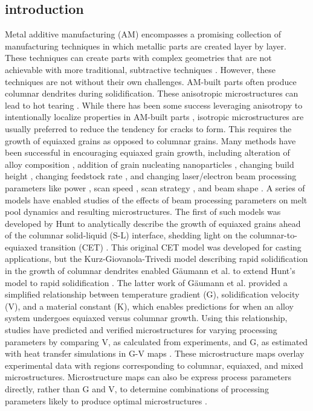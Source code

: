\subsection{introduction}
Metal additive manufacturing (AM) encompasses a promising collection of
manufacturing techniques in which metallic parts are created layer by
layer. These techniques can create parts with complex geometries that are
not achievable with more traditional, subtractive techniques
\cite{Chu2008}. However, these techniques are not without their own
challenges. AM-built parts often produce columnar dendrites during
solidification. These anisotropic microstructures can lead to hot tearing
\cite{Kaufmann2016,Martin2017,Gu2019}.
While there has been some success
leveraging anisotropy to intentionally localize properties in AM-built
parts \cite{Dehoff2015,Plotkowski2021}, isotropic microstructures are
usually preferred to reduce the tendency for cracks to form. This requires
the growth of equiaxed grains as opposed to columnar grains. Many methods
have been successful in encouraging equiaxed grain growth, including
alteration of alloy composition \cite{Spittle2013,Bermingham2019,Zhu2019},
addition of grain nucleating nanoparticles \cite{Martin2017,Gu2019}, changing
build height \cite{Qiu2015}, changing feedstock rate
\cite{Wu2004,Qiu2015}, and changing laser/electron beam processing
parameters like power \cite{Qiu2015,Balla2016,Kurzynowski2018}, scan speed
\cite{Wu2004,Qiu2015,Balla2016}, scan strategy
\cite{Dehoff2015,Kurzynowski2018}, and beam shape \cite{Roehling2020}.
A series of models have enabled studies of the effects of beam
processing parameters on melt pool dynamics and resulting microstructures.
The first of such models was developed by Hunt to analytically describe
the growth of equiaxed grains ahead of the columnar solid-liquid (S-L)
interface, shedding light on the columnar-to-equiaxed transition (CET)
\cite{Hunt1984}. This original CET model was developed for casting
applications, but the Kurz-Giovanola-Trivedi model describing rapid
solidification in the growth of columnar dendrites \cite{kgt1986} enabled
Gäumann et al. to extend Hunt's model to rapid solidification
\cite{Gaumann1997,Gaumann2001}. The latter work of Gäumann et al.
provided a simplified relationship between temperature gradient (G),
solidification velocity (V), and a material constant (K), which enables
predictions for when an alloy system undergoes equiaxed versus columnar growth.
Using this relationship, studies have predicted and verified
microstructures for varying processing parameters by comparing V, as
calculated from experiments, and G, as estimated with heat transfer
simulations in G-V maps
\cite{kgt1986,Kurz2001,Kurz2001b,Gaumann2001,Kobryn2003,Dehoff2015,Saville2021,Roehling2020,}.
These microstructure maps overlay experimental data with regions corresponding
to columnar, equiaxed, and mixed microstructures. Microstructure
maps can also be express process parameters directly, rather than G
and V, to determine combinations of processing parameters likely to
produce optimal microstructures \cite{Liang2016,Liang2017}.


